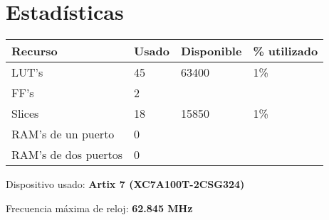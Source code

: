 \documentclass[11pt]{article}
\begin{document}
	\maketitle
	
	\section{Estadísticas}
		\begin{longtable}[l]{|p{4cm}|p{4cm}|p{4cm}|p{4cm}|}
			\hline
			\textbf{Recurso} & \textbf{Usado} & \textbf{Disponible} & \textbf{\% utilizado} \\ \hline \hline
			LUT's & 45 & 63400 & 1\% \\ \hline
			FF's & 2 &  &  \\ \hline
			Slices & 18 & 15850 & 1\% \\ \hline
			RAM's de un puerto & 0 & & \\ \hline
			RAM's de dos puertos & 0 & & \\ \hline
		\end{longtable}
	
		Dispositivo usado: \textbf{Artix 7 (XC7A100T-2CSG324)}
		
		Frecuencia máxima de reloj: \textbf{62.845 MHz}
		
\end{document}
